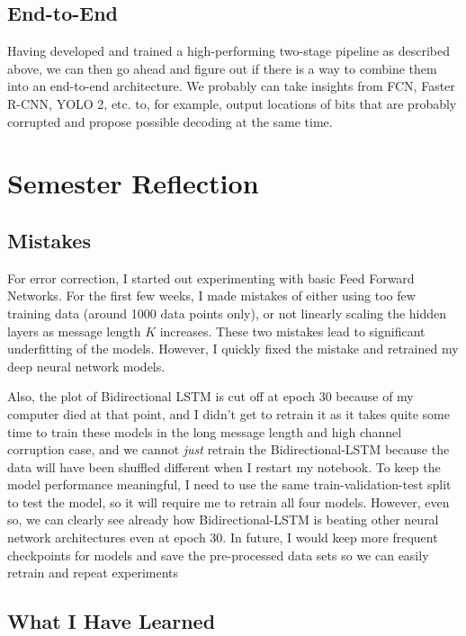 \documentclass[10pt,twocolumn,letterpaper]{article}
\begin{document}
\subsection{End-to-End}

Having developed and trained a high-performing two-stage pipeline as described above, we can then go ahead and figure out if there is a way to combine them into an end-to-end architecture. We probably can take insights from FCN, Faster R-CNN, YOLO 2, etc. to, for example, output locations of bits that are probably corrupted and propose possible decoding at the same time.


\section{Semester Reflection}

\subsection{Mistakes}

For error correction, I started out experimenting with basic Feed Forward Networks. For the first few weeks, I made mistakes of either using too few training data (around 1000 data points only), or not linearly scaling the hidden layers as message length $K$ increases. These two mistakes lead to significant underfitting of the models. However, I quickly fixed the mistake and retrained my deep neural network models.

Also, the plot of Bidirectional LSTM is cut off at epoch 30 because of my computer died at that point, and I didn't get to retrain it as it takes quite some time to train these models in the long message length and high channel corruption case, and we cannot \textit{just} retrain the Bidirectional-LSTM because the data will have been shuffled different when I restart my notebook. To keep the model performance meaningful, I need to use the same train-validation-test split to test the model, so it will require me to retrain all four models. However, even so, we can clearly see already how Bidirectional-LSTM is beating other neural network architectures even at epoch 30. In future, I would keep more frequent checkpoints for models and save the pre-processed data sets so we can easily retrain and repeat experiments


\subsection{What I Have Learned}
\end{document}
